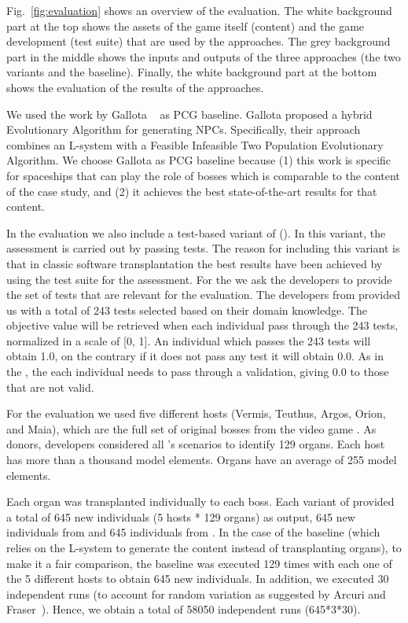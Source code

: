 Fig.~\ref{fig:evaluation} shows an overview of the evaluation. The white background part at the top shows the assets of the game itself (content) and the game development (test suite) that are used by the approaches. The grey background part in the middle shows the inputs and outputs of the three approaches (the two \ApproachName{} variants and the baseline). Finally, the white background part at the bottom shows the evaluation of the results of the approaches.

We used the work by Gallota \etal~\cite{gallotta2022evolving} as PCG baseline. Gallota \etal proposed a hybrid Evolutionary Algorithm for generating NPCs. Specifically, their approach combines an L-system with a Feasible Infeasible Two Population Evolutionary Algorithm. We choose Gallota \etal as PCG baseline because (1) this work is specific for spaceships that can play the role of bosses which is comparable to the content of the case study, and (2) it achieves the best state-of-the-art results for that content. 

In the evaluation we also include a test-based variant of \ApproachName{} (\timhotep{}). In this variant, the assessment is carried out by passing tests. The reason for including this variant is that in classic software transplantation the best results have been achieved by using the test suite for the assessment.
For the \timhotep{} we ask the developers to provide the set of tests that are relevant for the evaluation. The developers from \CaseStudy{} provided us with a total of 243 tests selected based on their domain knowledge. The objective value will be retrieved when each individual pass through the 243 tests, normalized in a scale of [0, 1]. An individual which passes the 243 tests will obtain 1.0, on the contrary if it does not pass any test it will obtain 0.0. As in the \simhotep{}, the each individual needs to pass through a validation, giving 0.0 to those that are not valid.

For the evaluation we used five different hosts (Vermis, Teuthus, Argos, Orion, and Maia), which are the full set of original bosses from the video game \CaseStudy{}. As donors, \CaseStudy{} developers considered all \CaseStudy{}'s scenarios to identify 129 organs. Each host has more than a thousand model elements. Organs have an average of 255 model elements.

Each organ was transplanted individually to each boss. Each variant of \ApproachName{} provided a total of 645 new individuals (5 hosts * 129 organs) as output, 645 new individuals from \simhotep{} and 645 individuals from \timhotep{}. In the case of the baseline (which relies on the L-system to generate the content instead of transplanting organs), to make it a fair comparison, the baseline was executed 129 times with each one of the 5 different hosts to obtain 645 new individuals. In addition, we executed 30 independent runs (to account for random variation as suggested by Arcuri and Fraser~\cite{arcuri2013parameter}). Hence, we obtain a total of 58050 independent runs (645*3*30).

